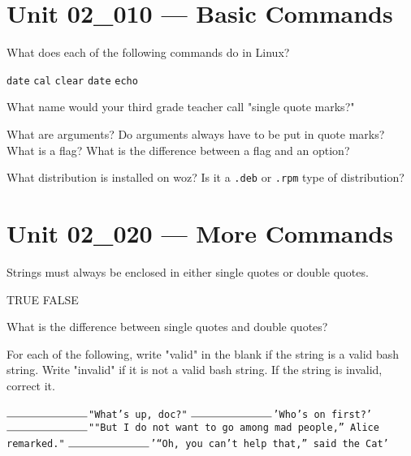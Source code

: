 \documentclass[letterpaper,12pt]{exam}
\newcommand{\unit}{Unit 02}
\begin{document}
\begin {questions}

\section*{\unit\_010 --- Basic Commands} %

\begin{samepage}
	\question What does each of the following commands do in Linux?
	\begin{checkboxes}
		\choice \texttt{{\huge date}}
		\choice \texttt{{\huge cal}}
		\choice \texttt{{\huge clear}}
		\choice \texttt{{\huge date}}
		\choice \texttt{{\huge echo}}
	\end{checkboxes}
	\end{samepage}

\question What name would your third grade teacher call "single quote marks?" 
\vspace{1.25cm}

\question What are arguments?  Do arguments always have to be put in quote marks? 
\vspace{1.25cm}
\question What is a flag?  What is the difference between a flag and an option? 

\question What distribution is installed on woz?  Is it a \texttt{.deb} or \texttt{.rpm} type of distribution? 

\section*{\unit\_020 --- More Commands} %

\begin{samepage}
\question Strings must always be enclosed in either single quotes or double quotes.
\begin{checkboxes}
\choice TRUE
\choice FALSE
\end{checkboxes}
\end{samepage}

\question What is the difference between single quotes and double quotes? 
\vspace{1.25cm}

\begin{samepage}
\question For each of the following, write "valid" in the blank if the string is a valid bash string. Write "invalid" if it is not a valid bash string. If the string is invalid, correct it.
\begin{checkboxes}
	\choice $\rule{2.5cm}{0.15mm}$\texttt{\Large "What's up, doc?"}
	\choice $\rule{2.5cm}{0.15mm}$\texttt{\Large 'Who's on first?'}
	\choice $\rule{2.5cm}{0.15mm}$\texttt{\Large ""But I do not want to go among mad people,” Alice remarked."}
	\choice $\rule{2.5cm}{0.15mm}$\texttt{\Large '“Oh, you can’t help that,” said the Cat'}


\end{checkboxes}
\end{samepage}
\end{questions}
\end{document}
